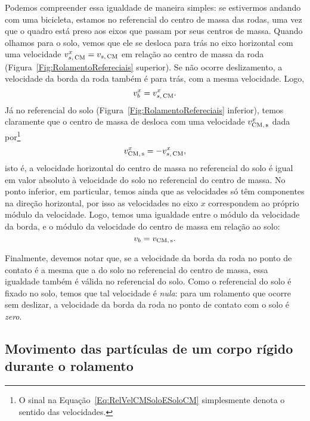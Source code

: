 Podemos compreender essa igualdade de maneira simples: se estivermos andando com uma bicicleta, estamos no referencial do centro de massa das rodas, uma vez que o quadro está preso aos eixos que passam por seus centros de massa. Quando olhamos para o solo, vemos que ele se desloca para trás no eixo horizontal com uma velocidade $v_{s,\,\rm{CM}}^x = v_{s,\,\rm{CM}}$ em relação ao centro de massa da roda (Figura~\ref{Fig:RolamentoRefereciais} superior). Se não ocorre deslizamento, a velocidade da borda da roda também é para trás, com a mesma velocidade. Logo,
\begin{equation}
    v_b^x = v_{s,\,\rm{CM}}^x.
\end{equation}
%
Já no referencial do solo (Figura~\ref{Fig:RolamentoRefereciais} inferior), temos claramente que o centro de massa de desloca com uma velocidade $v_{\rm{CM},\,s}^x$ dada por\footnote{O sinal na Equação~\ref{Eq:RelVelCMSoloESoloCM} simplesmente denota o sentido das velocidades.}
\begin{equation}\label{Eq:RelVelCMSoloESoloCM}
    v_{\rm{CM},\,s}^x = - v_{s,\,\rm{CM}}^x,
\end{equation}
%
isto é, a velocidade horizontal do centro de massa no referencial do solo é igual em valor absoluto à velocidade do solo no referencial do centro de massa. No ponto inferior, em particular, temos ainda que as velocidades só têm componentes na direção horizontal, por isso as velocidades no eixo $x$ correspondem ao próprio módulo da velocidade. Logo, temos uma igualdade entre o módulo da velocidade da borda, e o módulo da velocidade do centro de massa em relação ao solo:
\begin{equation}
    v_b = v_{\rm{CM},\,s}.
\end{equation}

Finalmente, devemos notar que, se a velocidade da borda da roda no ponto de contato é a mesma que a do solo no referencial do centro de massa, essa igualdade também é válida no referencial do solo. Como o referencial do solo é fixado no solo, temos que tal velocidade é \emph{nula}: para um rolamento que ocorre sem deslizar, a velocidade da borda da roda no ponto de contato com o solo é \emph{zero}.


\subsection{Movimento das partículas de um corpo rígido durante o rolamento}


